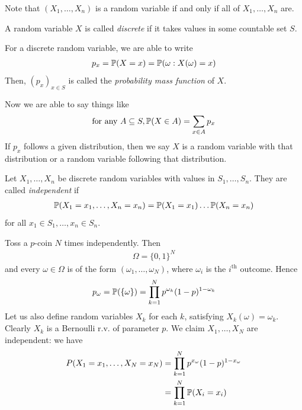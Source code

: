 \documentclass{../../template/note}
\begin{document}
    Note that \((X_1, \dots, X_n)\) is a random variable if and only if all of \(X_1, \dots, X_n\) are.

    \begin{definition}
        A random variable \(X\) is called \emph{discrete} if it takes values in some countable set \(S\).
    \end{definition}
    
    \begin{definition}
        For a discrete random variable, we are able to write
        \begin{align*}
            p_x = \mathbb P(X = x) = \mathbb P({\omega: X(\omega) = x})
        \end{align*}
        Then, \((p_x)_{x \in S}\) is called the \emph{probability mass function} of \(X\).        
    \end{definition}
    
    Now we are able to say things like
    \begin{align*}
        \text{for any }A \subseteq S, \mathbb P(X \in A) = \sum_{x \in A}p_x
    \end{align*}
    If \(p_x\) follows a given distribution, then we say \(X\) is a random variable with that distribution or a random variable following that distribution.
    
    \begin{definition}
        Let \(X_1, \dots, X_n\) be discrete random variables with values in \(S_1, \dots, S_n\). They are called \emph{independent} if
        \begin{align*}
            \mathbb P(X_1 = x_1, \dots, X_n = x_n) = \mathbb P(X_1 = x_1) \dots \mathbb P(X_n = x_n)
        \end{align*}
        for all \(x_1 \in S_1, \dots, x_n \in S_n\).
    \end{definition}
    
    \begin{example}
        Toss a \(p\)-coin \(N\) times independently. Then
        \begin{align*}
            \Omega = \{0, 1\}^N
        \end{align*}
        and every \(\omega \in \Omega\) is of the form \((\omega_1, \dots, \omega_N)\), where \(\omega_i\) is the \(i^\text{th}\) outcome. Hence
        \begin{align*}
            p_{\omega} = \mathbb P(\{\omega\}) = \prod_{k=1}^N p^{\omega_k} (1-p)^{1-\omega_k}
        \end{align*}
        Let us also define random variables \(X_k\) for each \(k\), satisfying \(X_k(\omega) = \omega_k\). Clearly \(X_k\) is a Bernoulli r.v. of parameter \(p\). We claim \(X_1, \dots, X_N\) are independent: we have
        \begin{align*}
            P(X_1 = x_1, \dots, X_N = x_N) &= \prod_{k=1}^N p^{x_\omega}(1-p)^{1-x_\omega} \\
            &= \prod_{k=1}^N \mathbb P(X_i = x_i)
        \end{align*}
    \end{example}
\end{document}
